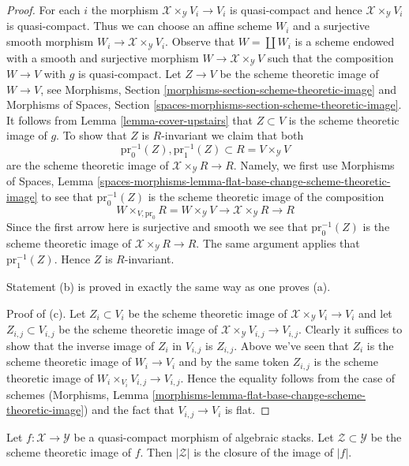 \begin{proof}
\medskip\noindent
For each $i$ the morphism $\mathcal{X} \times_\mathcal{Y} V_i \to V_i$
is quasi-compact and hence $\mathcal{X} \times_\mathcal{Y} V_i$ is
quasi-compact. Thus we can choose an affine scheme $W_i$ and a
surjective smooth morphism $W_i \to \mathcal{X} \times_\mathcal{Y} V_i$.
Observe that $W = \coprod W_i$ is a scheme endowed with
a smooth and surjective morphism $W \to \mathcal{X} \times_\mathcal{Y} V$
such that the composition $W \to V$ with $g$ is quasi-compact.
Let $Z \to V$ be the scheme theoretic image of $W \to V$, see
Morphisms, Section
\ref{morphisms-section-scheme-theoretic-image} and
Morphisms of Spaces, Section
\ref{spaces-morphisms-section-scheme-theoretic-image}.
It follows from Lemma \ref{lemma-cover-upstairs}
that $Z \subset V$ is the scheme theoretic image of $g$.
To show that $Z$ is $R$-invariant we claim that both
$$
\text{pr}_0^{-1}(Z), \text{pr}_1^{-1}(Z) \subset R = V \times_\mathcal{Y} V
$$
are the scheme theoretic image of $\mathcal{X} \times_\mathcal{Y} R \to R$.
Namely, we first use Morphisms of Spaces, Lemma
\ref{spaces-morphisms-lemma-flat-base-change-scheme-theoretic-image}
to see that $\text{pr}_0^{-1}(Z)$ is the scheme theoretic image
of the composition
$$
W \times_{V, \text{pr}_0} R = W \times_\mathcal{Y} V \to
\mathcal{X} \times_\mathcal{Y} R \to R
$$
Since the first arrow here is surjective and smooth we see that
$\text{pr}_0^{-1}(Z)$ is the scheme theoretic image of
$\mathcal{X} \times_\mathcal{Y} R \to R$. The same argument applies
that $\text{pr}_1^{-1}(Z)$. Hence $Z$ is $R$-invariant.

\medskip\noindent
Statement (b) is proved in exactly the same way as one proves (a).

\medskip\noindent
Proof of (c). Let $Z_i \subset V_i$ be the scheme theoretic image
of $\mathcal{X} \times_\mathcal{Y} V_i \to V_i$ and let
$Z_{i, j} \subset V_{i, j}$ be the scheme theoretic image of
$\mathcal{X} \times_\mathcal{Y} V_{i, j} \to V_{i, j}$.
Clearly it suffices to show that the inverse image of $Z_i$
in $V_{i, j}$ is $Z_{i, j}$. Above we've seen that
$Z_i$ is the scheme theoretic image of $W_i \to V_i$
and by the same token $Z_{i, j}$ is the scheme theoretic
image of $W_i \times_{V_i} V_{i, j} \to V_{i, j}$.
Hence the equality follows from the case of schemes
(Morphisms, Lemma
\ref{morphisms-lemma-flat-base-change-scheme-theoretic-image})
and the fact that $V_{i, j} \to V_i$ is flat.
\end{proof}

\begin{lemma}
\label{lemma-topology-scheme-theoretic-image}
Let $f : \mathcal{X} \to \mathcal{Y}$ be a quasi-compact
morphism of algebraic stacks. Let $\mathcal{Z} \subset \mathcal{Y}$
be the scheme theoretic image of $f$. Then $|\mathcal{Z}|$
is the closure of the image of $|f|$.
\end{lemma}

